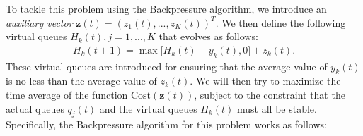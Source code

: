 \documentclass[journal]{IEEEtran}
\newcommand{\bv}[1]{{\boldsymbol{#1} }}
\newcommand{\script}[1]{{{\cal{#1} }}}
\begin{document}
To tackle this problem using the Backpressure algorithm, we introduce an  \emph{auxiliary vector} $\bv{z}(t)=(z_1(t), ..., z_K(t))^T$. 
We then define the following virtual queues $H_k(t), j=1,...,K$ that evolves as follows:
\begin{eqnarray}
H_k(t+1)=\max\big[ H_k(t) - y_k(t), 0 \big] + z_k(t). \label{eq:vq_def}
\end{eqnarray}
These virtual queues are introduced for ensuring that the average value of $y_k(t)$ is no less than the average value of $z_k(t)$. 
We will then try to maximize the time average of the function $\text{Cost}(\bv{z}(t))$, subject to the constraint that the actual queues $q_j(t)$ and the virtual queues $H_k(t)$ must all be stable. Specifically, the Backpressure algorithm for this problem works as follows: 

\end{document}
